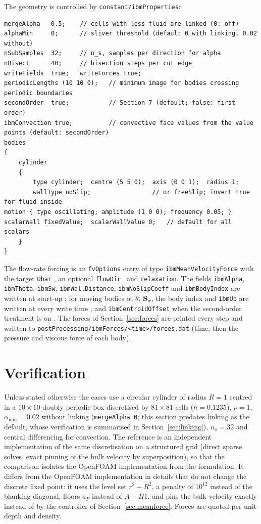 \documentclass[11pt,a4paper]{article}
\theoremstyle{remark}
\newcommand{\Sw}{\bm{S}_w}
\newcommand{\code}[1]{\texttt{#1}}
\begin{document}
The geometry is controlled by \code{constant/ibmProperties}:
\begin{lstlisting}
mergeAlpha   0.5;    // cells with less fluid are linked (0: off)
alphaMin     0;      // sliver threshold (default 0 with linking, 0.02 without)
nSubSamples  32;     // n_s, samples per direction for alpha
nBisect      40;     // bisection steps per cut edge
writeFields  true;   writeForces true;
periodicLengths (10 10 0);   // minimum image for bodies crossing periodic boundaries
secondOrder  true;           // Section 7 (default; false: first order)
ibmConvection true;          // convective face values from the value points (default: secondOrder)
bodies
{
    cylinder
    {
        type cylinder;  centre (5 5 0);  axis (0 0 1);  radius 1;
        wallType noSlip;                 // or freeSlip; invert true for fluid inside
motion { type oscillating; amplitude (1 0 0); frequency 0.05; }
scalarWall fixedValue;  scalarWallValue 0;   // default for all scalars
    }
}
\end{lstlisting}
The flow-rate forcing is an \code{fvOptions} entry of type \code{ibmMeanVelocityForce} with
the target \code{Ubar}%
, an optional \code{flowDir}%
\ and \code{relaxation}. The fields \code{ibmAlpha}, \code{ibmTheta}, \code{ibmSw},
\code{ibmWallDistance}, \code{ibmNoSlipCoeff} and \code{ibmBodyIndex} are written at start-up%
; for moving bodies $\alpha$, $\theta$, $\Sw$, the body index and \code{ibmUb} are
written at every write time%
, and \code{ibmCentroidOffset} when the second-order treatment is on%
. The forces of Section~\ref{sec:forces} are printed every step and written to
\code{postProcessing/ibmForces/<time>/forces.dat} (time, then the pressure and viscous force of
each body).
\section{Verification}
\label{sec:verif}

Unless stated otherwise the cases use a circular cylinder of radius $R=1$ centred in a
$10\times10$ doubly periodic box discretised by $81\times81$ cells ($h=0.1235$), $\nu=1$,
$\alpha_{\min}=0.02$ without linking (\code{mergeAlpha 0}; this section predates linking as the
default, whose verification is summarised in Section~\ref{sec:linking}), $n_s=32$ and central differencing for convection. The reference is an
independent implementation of the same discretisation on a structured grid (direct sparse
solves, exact pinning of the bulk velocity by superposition), so that the comparison isolates
the OpenFOAM implementation from the formulation. It differs from the OpenFOAM implementation
in details that do not change the discrete fixed point: it uses the level set $r^2-R^2$, a
penalty of $10^{12}$ instead of the blanking diagonal, floors $a_P$ instead of
$A-H1$, and pins the bulk velocity exactly instead of by the controller of
Section~\ref{sec:meanforce}. Forces are quoted per unit depth and density.
\end{document}
